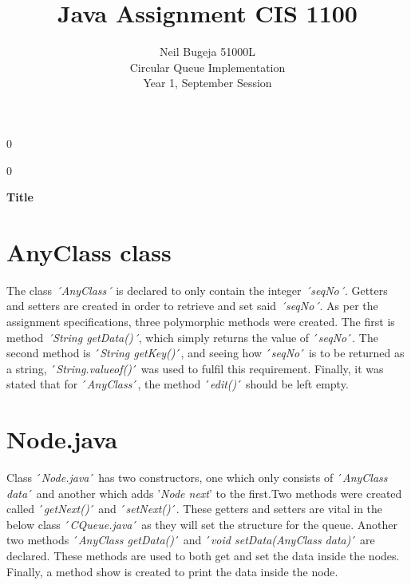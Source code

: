 \documentclass[12pt]{article}
\newcommand{\blind}{0}
\begin{document}
%

\def\spacingset#1{\renewcommand{\baselinestretch}%
{#1}\small\normalsize} \spacingset{1}



\blind
{
  \title{\bf Java Assignment CIS 1100}
  \author{Neil Bugeja 51000L
    \\Circular Queue Implementation
    \\Year 1, September Session\bigskip \bigskip}
  \maketitle
} \fi

\blind
{
  \bigskip
  \bigskip
  \bigskip
  \begin{center}
    {\LARGE\bf Title}
\end{center}
  \medskip
} \fi

\bigskip


\newpage
\spacingset{1.8} %


\tableofcontents

\newpage
\section{AnyClass class}
The class \emph{´AnyClass´} is declared to only contain the integer \emph{´seqNo´}. Getters and setters are created in order to retrieve and set said \emph{´seqNo´}. As per the assignment specifications, three polymorphic methods were created. The first is method \emph{´String getData()´}, which simply returns the value of ´\emph{seqNo}´. The second method is ´\emph{String getKey()}´, and seeing how ´\emph{seqNo}´ is to be returned as a string, ´\emph{String.valueof()}´ was used to fulfil this requirement. Finally, it was stated that for ´\emph{AnyClass}´, the method ´\emph{edit()}´ should be left empty.
\bigskip

\section{Node.java}
Class ´\emph{Node.java}´ has two constructors, one which only consists of ´\emph{AnyClass data}´ and another which adds '\emph{Node next}' to the first.Two methods were created called ´\emph{getNext()}´ and ´\emph{setNext()}´. These getters and setters are vital in the below class ´\emph{CQueue.java}´ as they will set the structure for the queue. Another two methods ´\emph{AnyClass getData()}´ and ´\emph{void setData(AnyClass data)}´ are declared. These methods are used to both get and set the data inside the nodes. Finally, a method show is created to print the data inside the node.
\bigskip
\end{document}
